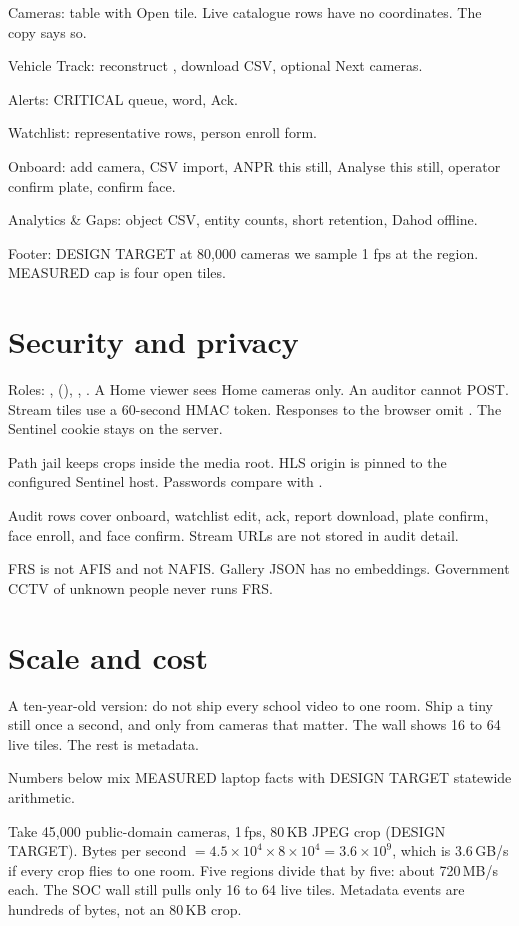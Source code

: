 \documentclass[listings]{csf301-notes}
\begin{document}
Cameras: table with Open tile. Live catalogue rows have no coordinates. The copy says so.

Vehicle Track: reconstruct , download CSV, optional Next cameras.

Alerts: CRITICAL queue,  word, Ack.

Watchlist: representative rows, person enroll form.

Onboard: add camera, CSV import, ANPR this still, Analyse this still, operator confirm plate, confirm face.

Analytics \& Gaps: object CSV, entity counts, short retention, Dahod offline.

Footer: DESIGN TARGET at 80{,}000 cameras we sample 1 fps at the region. MEASURED cap is four open tiles.

\section{Security and privacy}
Roles: ,  (), , . A Home viewer sees Home cameras only. An auditor cannot POST. Stream tiles use a 60-second HMAC token. Responses to the browser omit . The Sentinel cookie stays on the server.

Path jail keeps crops inside the media root. HLS origin is pinned to the configured Sentinel host. Passwords compare with .

Audit rows cover onboard, watchlist edit, ack, report download, plate confirm, face enroll, and face confirm. Stream URLs are not stored in audit detail.

FRS is not AFIS and not NAFIS. Gallery JSON has no embeddings. Government CCTV of unknown people never runs FRS.

\section{Scale and cost}
\label{sec:scale}
A ten-year-old version: do not ship every school video to one room. Ship a tiny still once a second, and only from cameras that matter. The wall shows 16 to 64 live tiles. The rest is metadata.

Numbers below mix MEASURED laptop facts with DESIGN TARGET statewide arithmetic.

\begin{example}
Take 45{,}000 public-domain cameras, 1\,fps, 80\,KB JPEG crop (DESIGN TARGET). Bytes per second $= 4.5 \times 10^{4} \times 8 \times 10^{4} = 3.6 \times 10^9$, which is 3.6\,GB/s if every crop flies to one room. Five regions divide that by five: about 720\,MB/s each. The SOC wall still pulls only 16 to 64 live tiles. Metadata events are hundreds of bytes, not an 80\,KB crop.
\end{example}
\end{document}
